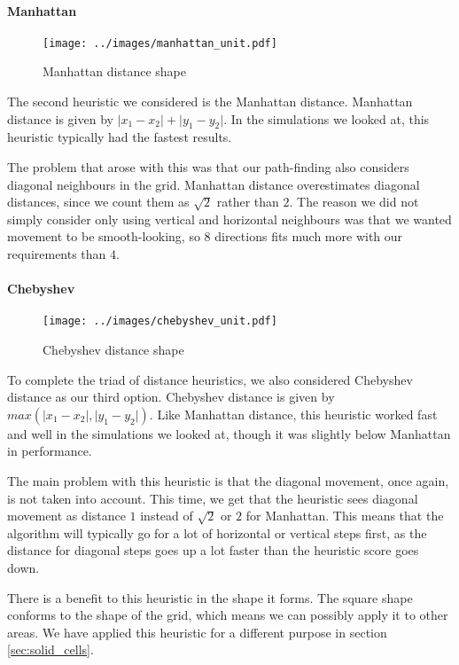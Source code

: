 \paragraph{Manhattan}
\begin{wrapfigure}{r}{0.30\textwidth}
\texttt{[image: ../images/manhattan\_unit.pdf]}
\caption{Manhattan distance shape}
\end{wrapfigure}
The second heuristic we considered is the Manhattan distance. Manhattan distance is given by $\lvert x_1 - x_2 \rvert + \lvert y_1 - y_2 \rvert$. In the simulations we looked at, this heuristic typically had the fastest results. 

The problem that arose with this was that our path-finding also considers diagonal neighbours in the grid. Manhattan distance overestimates diagonal distances, since we count them as $\sqrt{2}$ rather than $2$. The reason we did not simply consider only using vertical and horizontal neighbours was that we wanted movement to be smooth-looking, so $8$ directions fits much more with our requirements than $4$.

\paragraph{Chebyshev}
\label{sec:chebyshev}
\begin{wrapfigure}{r}{0.30\textwidth}
\texttt{[image: ../images/chebyshev\_unit.pdf]}
\caption{Chebyshev distance shape}
\end{wrapfigure}
To complete the triad of distance heuristics, we also considered Chebyshev distance as our third option. Chebyshev distance is given by $max(\lvert x_1 - x_2 \rvert, \lvert y_1 - y_2 \rvert)$. Like Manhattan distance, this heuristic worked fast and well in the simulations we looked at, though it was slightly below Manhattan in performance.

The main problem with this heuristic is that the diagonal movement, once again, is not taken into account. This time, we get that the heuristic sees diagonal movement as distance $1$ instead of $\sqrt{2}$ or $2$ for Manhattan. This means that the algorithm will typically go for a lot of horizontal or vertical steps first, as the distance for diagonal steps goes up a lot faster than the heuristic score goes down.

There is a benefit to this heuristic in the shape it forms. The square shape conforms to the shape of the grid, which means we can possibly apply it to other areas. We have applied this heuristic for a different purpose in section \ref{sec:solid_cells}.

